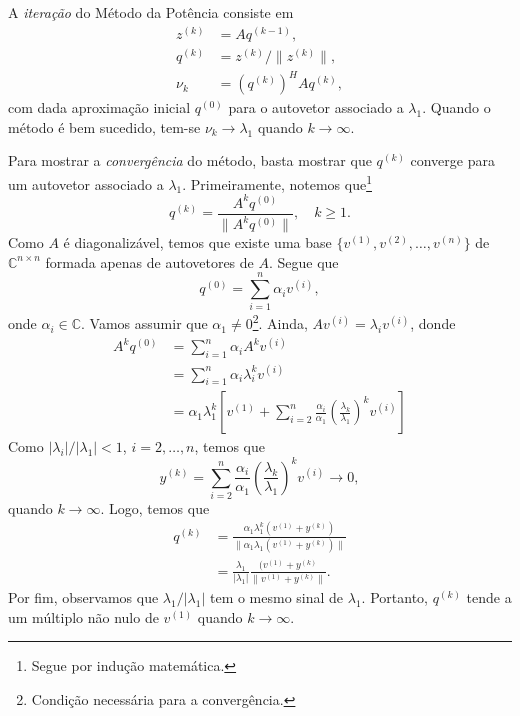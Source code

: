 A \emph{iteração} do Método da Potência consiste em
\begin{align}
  z^{(k)} &= Aq^{(k-1)},\\
  q^{(k)} &= z^{(k)}/\|z^{(k)}\|,\\
  \nu_k &= (q^{(k)})^H A q^{(k)},
\end{align}
com dada aproximação inicial $q^{(0)}$ para o autovetor associado a $\lambda_1$. Quando o método é bem sucedido, tem-se $\nu_k\to \lambda_1$ quando $k\to\infty$.

Para mostrar a \emph{convergência} do método, basta mostrar que $q^{(k)}$ converge para um autovetor associado a $\lambda_1$. Primeiramente, notemos que\footnote{Segue por indução matemática.}
\begin{equation}
  q^{(k)} = \frac{A^kq^{(0)}}{\|A^kq^{(0)}\|},\quad k\geq 1.
\end{equation}
Como $A$ é diagonalizável, temos que existe uma base $\{v^{(1)}, v^{(2)}, \dotsc, v^{(n)}\}$ de $\mathbb{C}^{n\times n}$ formada apenas de autovetores de $A$. Segue que
\begin{equation}
  q^{(0)} = \sum_{i=1}^n \alpha_i v^{(i)},
\end{equation}
onde $\alpha_i\in\mathbb{C}$. Vamos assumir que $\alpha_1\neq 0$\footnote{Condição necessária para a convergência.}. Ainda, $Av^{(i)} = \lambda_i v^{(i)}$, donde
\begin{align}
  A^kq^{(0)} &= \sum_{i=1}^n \alpha_iA^kv^{(i)}\\
             &= \sum_{i=1}^n \alpha_i\lambda_i^kv^{(i)}\\
             &= \alpha_1\lambda_1^k\left[v^{(1)} + \sum_{i=2}^n\frac{\alpha_i}{\alpha_1}\left(\frac{\lambda_k}{\lambda_1}\right)^kv^{(i)}\right]
\end{align}
Como $|\lambda_i|/|\lambda_1| < 1$, $i=2,\dotsc,n$, temos que
\begin{equation}
  y^{(k)} = \sum_{i=2}^n\frac{\alpha_i}{\alpha_1}\left(\frac{\lambda_k}{\lambda_1}\right)^kv^{(i)} \to 0,
\end{equation}
quando $k\to \infty$. Logo, temos que
\begin{align}
  q^{(k)} &= \frac{\alpha_1\lambda_1^k(v^{(1)}+y^{(k)})}{\|\alpha_1\lambda_1(v^{(1)}+y^{(k)})\|}\\
          &= \frac{\lambda_1}{|\lambda_1|}\frac{(v^{(1)}+y^{(k)}}{\|v^{(1)}+y^{(k)}\|}.
\end{align}
Por fim, observamos que $\lambda_1/|\lambda_1|$ tem o mesmo sinal de $\lambda_1$. Portanto, $q^{(k)}$ tende a um múltiplo não nulo de $v^{(1)}$ quando $k\to\infty$.

